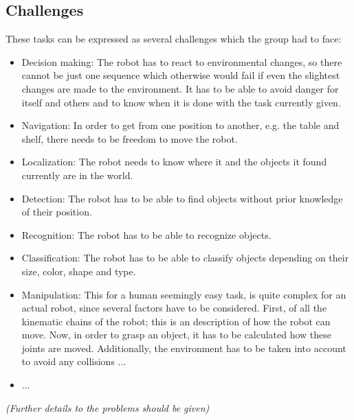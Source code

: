 \documentclass[main.tex]{subfiles}
\begin{document}
	\subsection{Challenges} 
	\chapterauthor{}
	These tasks can be expressed as several challenges which the group had to face:
	\begin{itemize}
		\item Decision making: The robot has to react to environmental changes, so there cannot be just one sequence which otherwise would fail if even the slightest changes are made to the environment. It has to be able to avoid danger for itself and others and to know when it is done with the task currently given.
		\item Navigation: In order to get from one position to another, e.g. the table and shelf, there needs to be freedom to move the robot. 
		\item Localization: The robot needs to know where it and the objects it found currently are in the world.
		\item Detection: The robot has to be able to find objects without prior knowledge of their position.
		\item Recognition: The robot has to be able to recognize objects.
		\item Classification: The robot has to be able to classify objects depending on their size, color, shape and type.
		\item Manipulation: This for a human seemingly easy task, is quite complex for an actual robot, since several factors have to be considered. First, of all the kinematic chains of the robot; this is an description of how the robot can move. Now, in order to grasp an object, it has to be calculated how these joints are moved. Additionally, the environment has to be taken into account to avoid any collisions ...
		\item ...

	\end{itemize}
	
	\textit{(Further details to the problems should be given)}	
	
\end{document}
